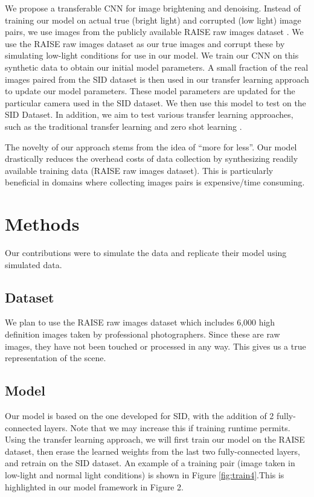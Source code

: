 \documentclass{article}
\begin{document}
We propose a transferable CNN for image brightening and denoising. Instead
of training our model on actual true (bright light) and corrupted
(low light) image pairs, we use images from the publicly available
RAISE raw images dataset \cite{Dang-Nguyen:2015:RRI:2713168.2713194}. We
use the RAISE raw images dataset as our true images and corrupt these by
simulating low-light conditions for use in our model. We train our CNN on
this synthetic
data to obtain our initial model parameters. A small fraction of the real
images paired from the SID dataset is then used in our transfer learning
\cite{Goodfellow-et-al-2016} approach to update our model parameters.
These model parameters are updated for the particular camera used in the
SID dataset. We then use this model to test on the SID Dataset. In
addition, we aim to test various transfer learning approaches, such as the
traditional transfer learning and zero shot learning \cite{larochelle2008, NIPS2009_3650,socher2013zeroshot}. \newline

The novelty of our approach stems from the idea of ``more for less''. Our
model drastically reduces the overhead costs of data collection by
synthesizing readily available training data (RAISE raw images dataset).
This is
particularly beneficial in domains where collecting images pairs is
expensive/time consuming.

\section{Methods}

Our contributions were to simulate the data and replicate their model
using simulated data.

\subsection{Dataset}

We plan to use the RAISE raw images dataset which includes 6,000 high
definition images taken by professional photographers. Since these are
raw images, they have not been touched or processed in any way. This gives
us a true representation of the scene. 

\subsection{Model}

Our model is based on the one developed for SID, with the addition of 2 fully-connected layers. Note that we may increase this if training runtime permits. Using the transfer learning approach, we will first train our model on the RAISE dataset, then erase the learned weights from the last two fully-connected layers, and retrain on the SID dataset. An example of a training pair
(image taken in low-light and normal light conditions) is shown in
Figure \ref{fig:train4}.This is highlighted in our model framework in Figure 2. 
\end{document}
